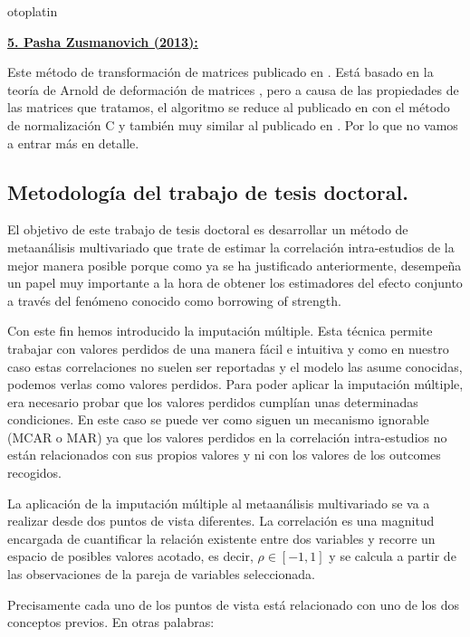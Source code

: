 otoplatin\documentclass[a4paper,openright,12pt]{report}
\begin{document}
\textbf{\underline{5. Pasha Zusmanovich (2013):}}

Este método de transformación de matrices publicado en \cite{Zusmanovich2013}. Está basado en la teoría de Arnold de deformación de matrices \cite{Arnold1971}, pero a causa de las propiedades de las matrices que tratamos, el algoritmo se reduce al publicado en \cite{Iman1982} con el método de normalización C y también muy similar al publicado en \cite{Rousseeuw1993}. Por lo que no vamos a entrar más en detalle.



\subsection{Metodología del trabajo de tesis doctoral.}

El objetivo de este trabajo de tesis doctoral es desarrollar un método de metaanálisis multivariado que trate de estimar la correlación intra-estudios de la mejor manera posible porque como ya se ha justificado anteriormente, desempeña un papel muy importante a la hora de obtener los estimadores del efecto conjunto a través del fenómeno conocido como borrowing of strength.

Con este fin hemos introducido la imputación múltiple. Esta técnica permite trabajar con valores perdidos de una manera fácil e intuitiva y como en nuestro caso estas correlaciones no suelen ser reportadas y el modelo las asume conocidas, podemos verlas como valores perdidos. Para poder aplicar la imputación múltiple, era necesario probar que los valores perdidos cumplían unas determinadas condiciones. En este caso se puede ver como siguen un mecanismo ignorable (MCAR o MAR) ya que los valores perdidos en la correlación intra-estudios no están relacionados con sus propios valores y ni con los valores de los outcomes recogidos.

La aplicación de la imputación múltiple al metaanálisis multivariado se va a realizar desde dos puntos de vista diferentes. La correlación es una magnitud encargada de cuantificar la relación existente entre dos variables y recorre un espacio de posibles valores acotado, es decir, $\rho \in \left[ -1,1 \right]$ y se calcula a partir de las observaciones de la pareja de variables seleccionada.

Precisamente cada uno de los puntos de vista está relacionado con uno de los dos conceptos previos. En otras palabras:
\end{document}
